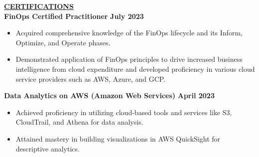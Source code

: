 \documentclass{article}
\begin{document}
\noindent \textbf{\underline{CERTIFICATIONS}} \\
\noindent \textbf{FinOps Certified Practitioner} \hfill \textbf{July 2023}
\begin{itemize}[noitemsep,nolistsep,leftmargin=*]
\item {\small Acquired comprehensive knowledge of the FinOps lifecycle and its Inform, Optimize, and Operate phases.}
\item {\small Demonstrated application of FinOps principles to drive increased business intelligence from cloud expenditure and developed proficiency in various cloud service providers such as AWS, Azure, and GCP.}\\
\end{itemize}
\noindent \textbf{Data Analytics on AWS (Amazon Web Services)} \hfill \textbf{April 2023}
\begin{itemize}[noitemsep,nolistsep,leftmargin=*]
\item {\small Achieved proficiency in utilizing cloud-based tools and services like S3, CloudTrail, and Athena for data analysis.}
\item {\small Attained mastery in building visualizations in AWS QuickSight for descriptive analytics.}
\end{itemize}




\end{document}
